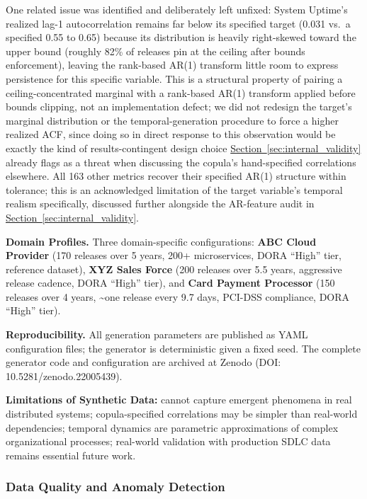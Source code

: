 \documentclass[technologies,article,submit,pdftex,moreauthors]{Definitions/mdpi}
\begin{document}
One related issue was identified and deliberately left unfixed: System Uptime's realized lag-1 autocorrelation remains far below its specified target (0.031 vs.~a specified 0.55 to 0.65) because its distribution is heavily right-skewed toward the upper bound (roughly 82\% of releases pin at the ceiling after bounds enforcement), leaving the rank-based AR(1) transform little room to express persistence for this specific variable. This is a structural property of pairing a ceiling-concentrated marginal with a rank-based AR(1) transform applied before bounds clipping, not an implementation defect; we did not redesign the target's marginal distribution or the temporal-generation procedure to force a higher realized ACF, since doing so in direct response to this observation would be exactly the kind of results-contingent design choice \hyperref[sec:internal_validity]{Section~\ref*{sec:internal_validity}} already flags as a threat when discussing the copula's hand-specified correlations elsewhere. All 163 other metrics recover their specified AR(1) structure within tolerance; this is an acknowledged limitation of the target variable's temporal realism specifically, discussed further alongside the AR-feature audit in \hyperref[sec:internal_validity]{Section~\ref*{sec:internal_validity}}.

\textbf{Domain Profiles.} Three domain-specific configurations: \textbf{ABC Cloud Provider} (170 releases over 5 years, 200+ microservices, DORA ``High'' tier, reference dataset), \textbf{XYZ Sales Force} (200 releases over 5.5 years, aggressive release cadence, DORA ``High'' tier), and \textbf{Card Payment Processor} (150 releases over 4 years, \textasciitilde one release every 9.7 days, PCI-DSS compliance, DORA ``High'' tier).

\textbf{Reproducibility.} All generation parameters are published as YAML configuration files; the generator is deterministic given a fixed seed. The complete generator code and configuration are archived at Zenodo (DOI: 10.5281/zenodo.22005439).

\textbf{Limitations of Synthetic Data:} cannot capture emergent phenomena in real distributed systems; copula-specified correlations may be simpler than real-world dependencies; temporal dynamics are parametric approximations of complex organizational processes; real-world validation with production SDLC data remains essential future work.

\subsubsection{Data Quality and Anomaly Detection}\label{sec:data_quality}
\end{document}
